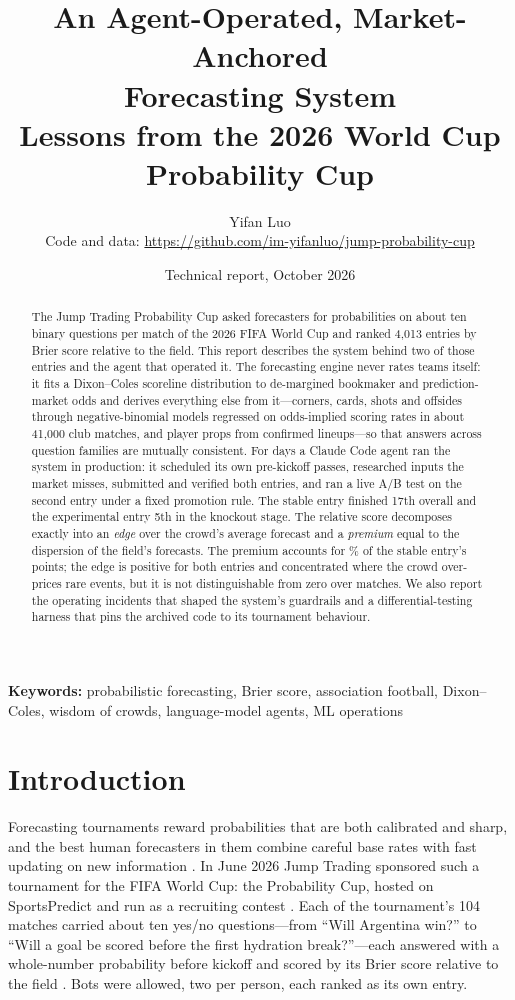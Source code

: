 \documentclass[11pt]{article}
\title{\textbf{An Agent-Operated, Market-Anchored}\\\textbf{Forecasting System}\\[8pt]
       \Large Lessons from the 2026 World Cup Probability Cup}
\author{Yifan Luo\\[3pt]
        \normalsize Code and data: \url{https://github.com/im-yifanluo/jump-probability-cup}}
\date{Technical report, October 2026}
\begin{document}
\maketitle

\begin{abstract}
\noindent
The Jump Trading Probability Cup asked forecasters for probabilities on about ten binary
questions per match of the 2026 FIFA World Cup and ranked 4,013 entries by Brier score relative
to the field. This report describes the system behind two of those entries and the agent that
operated it. The forecasting engine never rates teams itself: it fits a Dixon--Coles scoreline
distribution to de-margined bookmaker and prediction-market odds and derives everything else
from it---corners, cards, shots and offsides through negative-binomial models regressed on
odds-implied scoring rates in about 41,000 club matches, and player props from confirmed
lineups---so that answers across \numfamilies{} question families are mutually consistent. For
\OperatedDays{} days a Claude Code agent ran the system in production: it scheduled its own
pre-kickoff passes, researched inputs the market misses, submitted and verified both entries,
and ran a live A/B test on the second entry under a fixed promotion rule. The stable entry
finished 17th overall and the experimental entry 5th in the knockout stage. The relative score
decomposes exactly into an \emph{edge} over the crowd's average forecast and a \emph{premium}
equal to the dispersion of the field's forecasts. The premium accounts for \PremiumShareOne\%
of the stable entry's points; the edge is positive for both entries and concentrated where the
crowd over-prices rare events, but it is not distinguishable from zero over \MatchesOne{}
matches. We also report the operating incidents that shaped the system's guardrails and a
differential-testing harness that pins the archived code to its tournament behaviour.
\end{abstract}

\noindent\textbf{Keywords:} probabilistic forecasting, Brier score, association football,
Dixon--Coles, wisdom of crowds, language-model agents, ML operations

\section{Introduction}\label{sec:intro}

Forecasting tournaments reward probabilities that are both calibrated and sharp, and the best
human forecasters in them combine careful base rates with fast updating on new information
\citep{mellers2014, tetlock2015}. In June 2026 Jump Trading sponsored such a tournament for the
FIFA World Cup: the Probability Cup, hosted on SportsPredict and run as a recruiting contest
\citep{jump2026}. Each of the tournament's 104 matches carried about ten yes/no
questions---from ``Will Argentina win?'' to ``Will a goal be scored before the first hydration
break?''---each answered with a whole-number probability before kickoff and scored by its Brier
score relative to the field \citep{sportspredict2026}. Bots were allowed, two per person, each
ranked as its own entry.
\end{document}
